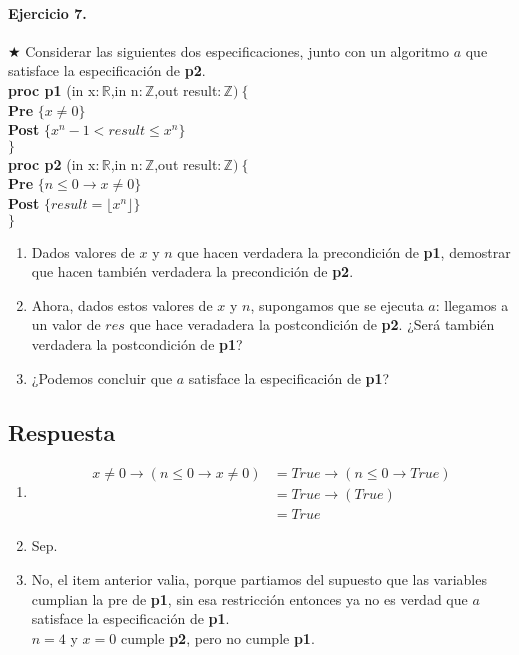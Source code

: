 \documentclass[a4paper]{article}
\begin{document}
\paragraph*{Ejercicio 7.}$\bigstar$ Considerar las siguientes dos especificaciones, junto con un algoritmo $a$ que satisface la especificación de \textbf{p2}.\medskip \\
		\textbf{proc p1 }(in x$: \mathbb{R}$,in n$: \mathbb{Z}$,out result$:\mathbb{Z})\ \{$\smallskip \\
		\hspace*{6mm} \textbf{Pre }$\{x\neq 0\}$\smallskip \\
		\hspace*{6mm} \textbf{Post }$\{x^n-1<result\leq x^n\}$\\
		$\}$\medskip \\
		\textbf{proc p2 }(in x$: \mathbb{R}$,in n$: \mathbb{Z}$,out result$:\mathbb{Z})\ \{$\smallskip \\
		\hspace*{6mm} \textbf{Pre }$\{ n\leq 0\rightarrow x\neq 0\}$\smallskip \\
		\hspace*{6mm} \textbf{Post }$\{result=\lfloor x^n\rfloor\}$\\
		$\}$
	\begin{enumerate}[label=\alph*)]
		\item Dados valores de $x$ y $n$ que hacen verdadera la precondición de \textbf{p1}, demostrar que hacen también verdadera la precondición de \textbf{p2}.
		\item Ahora, dados estos valores de $x$ y $n$, supongamos que se ejecuta $a$: llegamos a un valor de $res$ que hace veradadera la postcondición de \textbf{p2}. ¿Será también verdadera la postcondición de \textbf{p1}?
		\item ¿Podemos concluir que $a$ satisface la especificación de \textbf{p1}? 
	\end{enumerate}
\subsection*{Respuesta}
	\begin{enumerate}[label=\alph*)]
		\item
			\begin{align*}
			x\neq 0 \rightarrow (n\leq 0 \rightarrow x\neq 0) &= True\rightarrow 
			(n\leq 0 \rightarrow True)\\
			&= True\rightarrow (True)\\
			&= True
			\end{align*}
		\item Sep.
		\item No, el item anterior valia, porque partiamos del supuesto que las 
			variables cumplian la pre de \textbf{p1}, sin esa restricción entonces ya
			no es verdad que $a$ satisface la especificación de \textbf{p1}.\\
			$n=4$ y $x=0$ cumple \textbf{p2}, pero no cumple \textbf{p1}.
	\end{enumerate}
	
\end{document}
